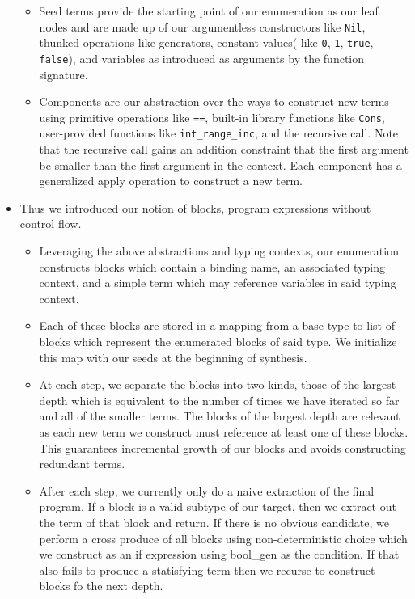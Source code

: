 \documentclass[review, sigplan]{acmart}
\begin{document}
\begin{itemize}
          \begin{itemize}
              \item Seed terms provide the starting point of our enumeration as our leaf nodes and are made up of our argumentless constructors like \texttt{Nil}, thunked operations like generators, constant values( like \texttt{0}, \texttt{1}, \texttt{true}, \texttt{false}), and variables as introduced as arguments by the function signature.
              \item Components are our abstraction over the ways to construct new terms using primitive operations like \texttt{==}, built-in library functions like \texttt{Cons}, user-provided functions like \texttt{int\_range\_inc}, and the recursive call. Note that the recursive call gains an addition constraint that the first argument be smaller than the first argument in the context. Each component has a generalized apply operation to construct a new term.
          \end{itemize}
    \item Thus we introduced our notion of blocks, program expressions without control flow.
          \begin{itemize}
              \item Leveraging the above abstractions and typing contexts, our enumeration constructs blocks which contain a binding name, an associated typing context, and a simple term which may reference variables in said typing context.
              \item Each of these blocks are stored in a mapping from a base type to list of blocks which represent the enumerated blocks of said type. We initialize this map with our seeds at the beginning of synthesis.
              \item At each step, we separate the blocks into two kinds, those of the largest depth which is equivalent to the number of times we have iterated so far and all of the smaller terms. The blocks of the largest depth are relevant as each new term we construct must reference at least one of these blocks. This guarantees incremental growth of our blocks and avoids constructing redundant terms.
              \item After each step, we currently only do a naive extraction of the final program. If a block is a valid subtype of our target, then we extract out the term of that block and return. If there is no obvious candidate, we perform a cross produce of all blocks using non-deterministic choice which we construct as an if expression using bool\_gen as the condition. If that also fails to produce a statisfying term then we recurse to construct blocks fo the next depth.
          \end{itemize}

\end{itemize}
\end{document}
